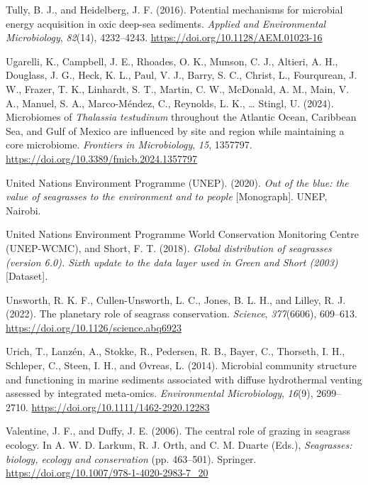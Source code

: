 \documentclass[
  12 pt,
]{book}
\newlength{\cslhangindent}
\newlength{\cslentryspacingunit} %
\newenvironment{CSLReferences}[2] %
 {%
  \setlength{\parindent}{0pt}
  \ifodd #1
  \let\oldpar\par
  \def\par{\hangindent=\cslhangindent\oldpar}
  \fi
  \setlength{\parskip}{#2\cslentryspacingunit}
 }%
 {}
\begin{document}
\begin{CSLReferences}{1}{0}
\leavevmode{}%
Tully, B. J., and Heidelberg, J. F. (2016). Potential mechanisms for microbial energy acquisition in oxic deep-sea sediments. \emph{Applied and Environmental Microbiology}, \emph{82}(14), 4232--4243. \url{https://doi.org/10.1128/AEM.01023-16}

\leavevmode{}%
Ugarelli, K., Campbell, J. E., Rhoades, O. K., Munson, C. J., Altieri, A. H., Douglass, J. G., Heck, K. L., Paul, V. J., Barry, S. C., Christ, L., Fourqurean, J. W., Frazer, T. K., Linhardt, S. T., Martin, C. W., McDonald, A. M., Main, V. A., Manuel, S. A., Marco-Méndez, C., Reynolds, L. K., \ldots{} Stingl, U. (2024). Microbiomes of {{{\emph{Thalassia testudinum}}} throughout the Atlantic Ocean, Caribbean Sea, and Gulf of Mexico are influenced by site and region while maintaining a core microbiome}. \emph{Frontiers in Microbiology}, \emph{15}, 1357797. \url{https://doi.org/10.3389/fmicb.2024.1357797}

\leavevmode{}%
United Nations Environment Programme (UNEP). (2020). \emph{Out of the blue: the value of seagrasses to the environment and to people} {[}Monograph{]}. UNEP, Nairobi.

\leavevmode{}%
United Nations Environment Programme World Conservation Monitoring Centre (UNEP-WCMC), and Short, F. T. (2018). \emph{Global distribution of seagrasses (version 6.0). {Sixth} update to the data layer used in {Green} and {Short} (2003)} {[}Dataset{]}.

\leavevmode{}%
Unsworth, R. K. F., Cullen-Unsworth, L. C., Jones, B. L. H., and Lilley, R. J. (2022). The planetary role of seagrass conservation. \emph{Science}, \emph{377}(6606), 609--613. \url{https://doi.org/10.1126/science.abq6923}

\leavevmode{}%
Urich, T., Lanzén, A., Stokke, R., Pedersen, R. B., Bayer, C., Thorseth, I. H., Schleper, C., Steen, I. H., and Øvreas, L. (2014). Microbial community structure and functioning in marine sediments associated with diffuse hydrothermal venting assessed by integrated meta-omics. \emph{Environmental Microbiology}, \emph{16}(9), 2699--2710. \url{https://doi.org/10.1111/1462-2920.12283}

\leavevmode{}%
Valentine, J. F., and Duffy, J. E. (2006). The central role of grazing in seagrass ecology. In A. W. D. Larkum, R. J. Orth, and C. M. Duarte (Eds.), \emph{Seagrasses: biology, ecology and conservation} (pp. 463--501). Springer. \url{https://doi.org/10.1007/978-1-4020-2983-7_20}


\end{CSLReferences}
\end{document}
